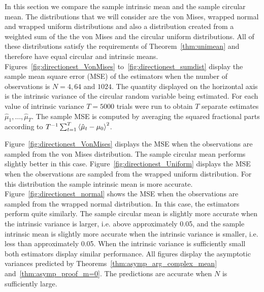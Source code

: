 \documentclass[journal]{../bib/IEEEtran}
\begin{document}
In this section we compare the sample intrinsic mean and the sample circular mean.  %
The distributions that we will consider are the von Mises, wrapped normal and wrapped uniform distributions \cite[Ch.~3]{Fisher1993}\cite[Ch.~3]{Mardia_directional_statistics}\cite[Ch.~4]{McKilliam2010thesis} and also a distribution created from a weighted sum of the the von Mises and the circular uniform distributions.  All of these distributions satisfy the requirements of Theorem~\ref{thm:unimean} and therefore have equal circular and intrinsic means.  %
Figures~\ref{fig:directionest_VonMises} to~\ref{fig:directionest_sumdist} display the sample mean square error (MSE) of the estimators when the number of observations is $N=4,64$ and $1024$. The quantity displayed on the horizontal axis is the intrinsic variance of the circular random variable being estimated. For each value of intrinsic variance $T = 5000$ trials were run to obtain $T$ separate estimates $\hat{\mu}_1, \dots, \hat{\mu}_{T}$. The sample MSE is computed by averaging the squared fractional parts according to $T^{-1}\sum_{t=1}^{T}\left<  \hat{\mu}_t - \mu_0 \right>^2$.

Figure~\ref{fig:directionest_VonMises} displays the MSE when the observations are sampled from the von Mises distribution. The sample circular mean performs slightly better in this case.  Figure~\ref{fig:directionest_Uniform} displays the MSE when the observations are sampled from the wrapped uniform distribution.  For this distribution the sample intrinsic mean is more accurate.  Figure~\ref{fig:directionest_normal} shows the MSE when the observations are sampled from the wrapped normal distribution.  In this case, the estimators perform quite similarly.  The sample circular mean is slightly more accurate when the intrinsic variance is larger, i.e. above approximately 0.05, and the sample intrinsic mean is slightly more accurate when the intrinsic variance is smaller, i.e. less than approximately 0.05.  When the intrinsic variance is sufficiently small both estimators display similar performance.  All figures display the asymptotic variances predicted by Theorems~\ref{thm:asymp_arg_complex_mean} and~\ref{thm:asymp_proof_m=0}.  The predictions are accurate when $N$ is sufficiently large.
\end{document}
